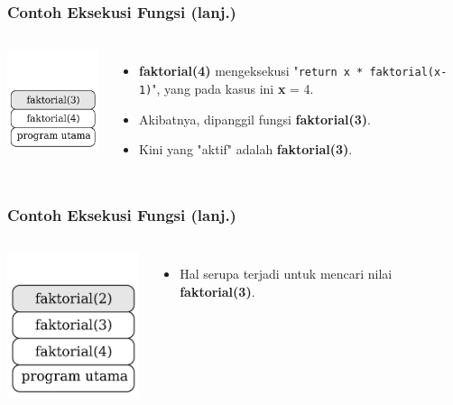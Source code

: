\begin{frame}
\frametitle{Contoh Eksekusi Fungsi (lanj.)}
\begin{columns}
    \centering
    \includegraphics[width=4cm]{asset/rekursi-3.pdf}
    \begin{itemize}
      \item \textbf{faktorial(4)} mengeksekusi "\texttt{return x * faktorial(x-1)}", yang pada kasus ini \textbf{x} = 4.
      \item Akibatnya, dipanggil fungsi \textbf{faktorial(3)}. 
      \item Kini yang "aktif" adalah \textbf{faktorial(3)}.
    \end{itemize}
  \end{columns} 
\end{frame}

\begin{frame}
\frametitle{Contoh Eksekusi Fungsi (lanj.)}
\begin{columns}
    \centering
    \includegraphics[width=4cm]{asset/rekursi-4.pdf}
    \begin{itemize}
      \item Hal serupa terjadi untuk mencari nilai \textbf{faktorial(3)}.
    \end{itemize}
  \end{columns} 
\end{frame}

